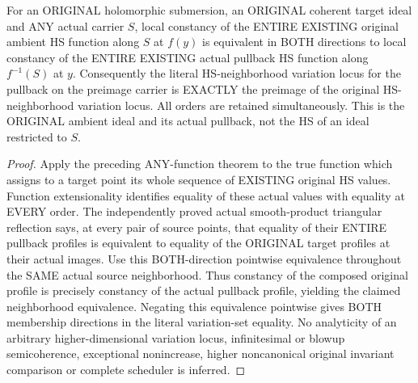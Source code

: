 \begin{theorem}
\label{hir:original-submersion-entire-hs-actual-carrier-neighborhood-variation}
\leanok
For an ORIGINAL holomorphic submersion, an ORIGINAL coherent target ideal
and ANY actual carrier $S$, local constancy of the ENTIRE EXISTING
original ambient HS function along $S$ at $f(y)$ is equivalent in BOTH
directions to local constancy of the ENTIRE EXISTING actual pullback HS
function along $f^{-1}(S)$ at $y$. Consequently the literal HS-neighborhood
variation locus for the pullback on the preimage carrier is EXACTLY the
preimage of the original HS-neighborhood variation locus. All orders are
retained simultaneously. This is the ORIGINAL ambient ideal and its
actual pullback, not the HS of an ideal restricted to $S$.
\end{theorem}
\begin{proof}
Apply the preceding ANY-function theorem to the true function which
assigns to a target point its whole sequence of EXISTING original HS
values. Function extensionality identifies equality of these actual
values with equality at EVERY order. The independently proved actual
smooth-product triangular reflection says, at every pair of source
points, that equality of their ENTIRE pullback profiles is equivalent
to equality of the ORIGINAL target profiles at their actual images.
Use this BOTH-direction pointwise equivalence throughout the SAME actual
source neighborhood. Thus constancy of the composed original profile
is precisely constancy of the actual pullback profile, yielding the
claimed neighborhood equivalence. Negating this equivalence pointwise
gives BOTH membership directions in the literal variation-set equality.
No analyticity of an arbitrary higher-dimensional variation locus,
infinitesimal or blowup semicoherence, exceptional nonincrease, higher
noncanonical original invariant comparison or complete scheduler is
inferred.
\end{proof}

